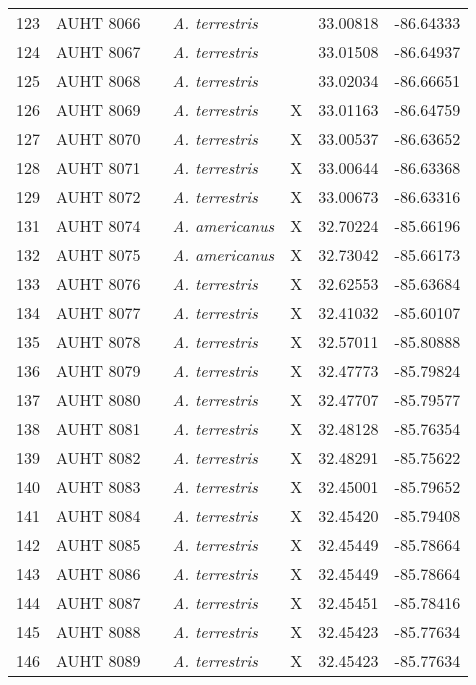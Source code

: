 \begin{longtable}{ lllllll }
123 & AUHT 8066 &  & \textit{A. terrestris} &  & 33.00818 & -86.64333 \\ 
124 & AUHT 8067 &  & \textit{A. terrestris} &  & 33.01508 & -86.64937 \\ 
125 & AUHT 8068 &  & \textit{A. terrestris} &  & 33.02034 & -86.66651 \\ 
126 & AUHT 8069 &  & \textit{A. terrestris} & X & 33.01163 & -86.64759 \\ 
127 & AUHT 8070 &  & \textit{A. terrestris} & X & 33.00537 & -86.63652 \\ 
128 & AUHT 8071 &  & \textit{A. terrestris} & X & 33.00644 & -86.63368 \\ 
129 & AUHT 8072 &  & \textit{A. terrestris} & X & 33.00673 & -86.63316 \\ 
131 & AUHT 8074 &  & \textit{A. americanus} & X & 32.70224 & -85.66196 \\ 
132 & AUHT 8075 &  & \textit{A. americanus} & X & 32.73042 & -85.66173 \\ 
133 & AUHT 8076 &  & \textit{A. terrestris} & X & 32.62553 & -85.63684 \\ 
134 & AUHT 8077 &  & \textit{A. terrestris} & X & 32.41032 & -85.60107 \\ 
135 & AUHT 8078 &  & \textit{A. terrestris} & X & 32.57011 & -85.80888 \\ 
136 & AUHT 8079 &  & \textit{A. terrestris} & X & 32.47773 & -85.79824 \\ 
137 & AUHT 8080 &  & \textit{A. terrestris} & X & 32.47707 & -85.79577 \\ 
138 & AUHT 8081 &  & \textit{A. terrestris} & X & 32.48128 & -85.76354 \\ 
139 & AUHT 8082 &  & \textit{A. terrestris} & X & 32.48291 & -85.75622 \\ 
140 & AUHT 8083 &  & \textit{A. terrestris} & X & 32.45001 & -85.79652 \\ 
141 & AUHT 8084 &  & \textit{A. terrestris} & X & 32.45420 & -85.79408 \\ 
142 & AUHT 8085 &  & \textit{A. terrestris} & X & 32.45449 & -85.78664 \\ 
143 & AUHT 8086 &  & \textit{A. terrestris} & X & 32.45449 & -85.78664 \\ 
144 & AUHT 8087 &  & \textit{A. terrestris} & X & 32.45451 & -85.78416 \\ 
145 & AUHT 8088 &  & \textit{A. terrestris} & X & 32.45423 & -85.77634 \\ 
146 & AUHT 8089 &  & \textit{A. terrestris} & X & 32.45423 & -85.77634 \\ 

\end{longtable}
